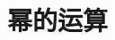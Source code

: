 \section{幂的运算}

\begin{comment}
\item {
    当 $ x=7, y=-\frac{1}{7}$ 时, 求 $x^{4n+1}\cdot y^{4n+2}$ ($n$为整数)的值. 
    \ifshowSolution
        \fangsong\zihao{4}
        \\
        思路: 观察到$xy=-1$, 让将$x$和$y$凑成一对, 相乘. 直接将$x, y$的值代入表达式中进行计算. 

        解答: 
        \begin{align*}
            \mbox{原式} &= 7^{4n+1}\cdot \left(-\frac{1}{7}\right) ^{4n+2}\\
            &= [7\times(-\frac{1}{7})]^{4n+1} \cdot(-\frac{1}{7})\\
            &= (-1)^{4n+1} \cdot(-\frac{1}{7})\\
            &= \frac{1}{7}. 
        \end{align*}
    \else
        \\ \\ \\
    \fi
}
\end{comment}

\begin{comment}
\item {
    已知$ m=8^9, n=9^8 $, 用含$m, n$的式子表示 $72^{72}$. 
    \ifshowSolution
        \fangsong\zihao{4}
        \\
        思路: 观察到$72=8\times 9$, 将原式中的72分解, 凑出$m, n$. 
        
        解答: 
        \begin{align*}
            \mbox{原式} &= (8\times 9)^{72}\\
            &= 8^{72}\times 9^{72}\\
            &= (8^9)^8\times (9^8)^9\\
            &= m^8 n^9. 
        \end{align*}
    \else
        \\ \\ \\
    \fi
}
\end{comment}

\begin{comment}
\item {
    已知$x-y=k$, 求$(3x-3y)^3. $
    \ifshowSolution
        \fangsong\zihao{4}
        \\
        解答: 
        \begin{align*}
            \mbox{原式} &= [3(x-y)]^3\\
            &= 27(x-y)^3\\
            &= 27k^3. 
        \end{align*}
    \else
        \\ \\ \\
    \fi
}
\end{comment}


